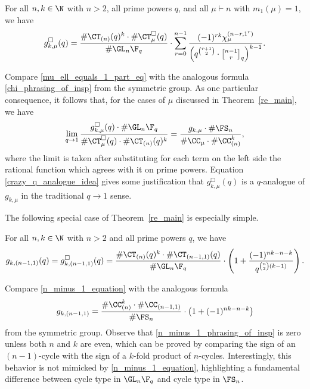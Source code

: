 \begin{theorem}
\label{re_main}
For all \(n, k \in \N\) with \(n > 2\), all prime powers \(q\), and all \(\mu \vdash n\) with \(m_1(\mu) = 1\), we have
\begin{equation}
\label{mu_ell_equals_1_part_eq}
g_{k,\mu}^\Box(q)
=
\frac{\# \CT_{(n)} (q)^k
\cdot
\# \CT_\mu^\Box (q)}{\# \GL_n \F_q}
\cdot
\sum_{r=0}^{n-1}
\frac{(-1)^{rk} \chi^{(n-r,1^r)}_\mu}{\left ( q^{\binom{r+1}{2}} \cdot {\genfrac[]{0pt}{1}{n - 1}{r}}_{q} \right )^{k-1}}.
\end{equation}
\end{theorem}

Compare \eqref{mu_ell_equals_1_part_eq} with the analogous formula \eqref{chi_phrasing_of_insp} from the symmetric group.
As one particular consequence, it follows that, for the cases of \(\mu\) discussed in Theorem~\ref{re_main}, we have
\begin{equation}
\label{crazy_q_analogue_idea}
\lim_{q \to 1}
\frac{g_{k,\mu}^\Box (q) \cdot \# \GL_n \F_q }{\# \CT^\Box_\mu (q) \cdot \# \CT_{(n)} (q)^k }
=
\frac{g_{k,\mu} \cdot \# \FS_n}{\# \CC_\mu \cdot \# \CC_{(n)}^k},
\end{equation}
where the limit is taken after substituting for each term on the left side the rational function which agrees with it on prime powers.
Equation \eqref{crazy_q_analogue_idea} gives some justification that \(g_{k,\mu}^\Box (q)\) is a \(q\)-analogue of \(g_{k,\mu}\) in the traditional \(q \to 1\) sense.

The following special case of Theorem~\ref{re_main} is especially simple.
\begin{corollary}
\label{n_minus_1_corollary}
For all \(n,k \in \N\) with \(n > 2\) and all prime powers \(q\), we have
\begin{equation}
\label{n_minus_1_equation}
g_{k,(n-1,1)} (q)
=
g^\Box_{k,(n-1,1)} (q)
=
\frac{\# \CT_{(n)} (q)^k
\cdot
\# \CT_{(n-1,1)} (q)}{\# \GL_n \F_q}
\cdot
\left (
1 + \frac{(-1)^{nk-n-k}}{q^{\binom{n}{2}(k-1)}}
\right ).
\end{equation}
\end{corollary}

Compare \eqref{n_minus_1_equation}
with the analogous formula
\begin{equation}
\label{n_minus_1_phrasing_of_insp}
g_{k,(n-1,1)}
=
\frac{\# \CC_{(n)}^k
\cdot
\# \CC_{(n-1,1)}}{\# \FS_n}
\cdot
\left (
1 + (-1)^{nk-n-k}
\right )
\end{equation}
from the symmetric group.
Observe that \eqref{n_minus_1_phrasing_of_insp} is zero unless both \(n\) and \(k\) are even, which can be proved by comparing the sign of an \((n-1)\)-cycle with the sign of a \(k\)-fold product of \(n\)-cycles.
Interestingly, this behavior is not mimicked by \eqref{n_minus_1_equation}, highlighting a fundamental difference between cycle type in \(\GL_n \F_q\) and cycle type in \(\FS_n\).

